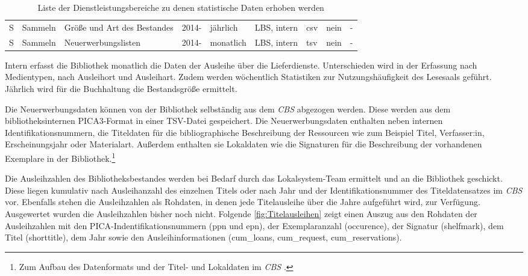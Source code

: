 \begin{table}[H]
\begin{adjustbox}{max width=\textwidth}
\begin{tabular}{p{}p{}p{}p{}p{}p{}p{}p{}p{}}
            S         &Sammeln                       & Größe und Art des Bestandes                   & 2014-             & jährlich          & LBS, intern  & csv                       & nein  & -\\ 
            S         &Sammeln                       & Neuerwerbungslisten                           & 2014-             & monatlich         & LBS, intern  & tsv                       & nein  & -\\ 
            

        \bottomrule
    \end{tabular}
    \end{adjustbox}
    \caption{%
        Liste der Dienstleistungsbereiche zu denen statistische Daten erhoben werden
    \label{tab:Statistische_Daten}
    }
     \end{table}

    
\endgroup


Intern erfasst die Bibliothek monatlich die Daten der Ausleihe über die Lieferdienste. Unterschieden 
wird in der Erfassung nach Medientypen, nach Ausleihort und Ausleihart. Zudem werden wöchentlich 
Statistiken zur Nutzungshäufigkeit des Lesesaals geführt. Jährlich wird für die Buchhaltung die Bestandsgröße ermittelt.

Die Neuerwerbungsdaten können von der Bibliothek selbständig aus dem \textit{\acrshort{CBS}} abgezogen werden. Diese werden aus
dem bibliotheksinternen PICA3-Format in einer TSV-Datei gespeichert. Die Neuerwerbungsdaten enthalten neben internen Identifikationsnummern, die Titeldaten für die bibliographische Beschreibung der Ressourcen wie zum Beispiel Titel, Verfasser:in, Erscheinungsjahr oder Materialart.
Außerdem enthalten sie Lokaldaten wie die Signaturen für die Beschreibung der vorhandenen Exemplare in der Bibliothek.\footnote{Zum Aufbau des Datenformats und der Titel- und Lokaldaten im \textit{\acrlong{CBS}} \cite[vgl.][]{hebis_datenstruktur_2017}.}

Die Ausleihzahlen des Bibliotheksbestandes werden bei Bedarf durch das Lokalsystem-Team ermittelt und an die Bibliothek geschickt. 
Diese liegen kumulativ nach Ausleihanzahl des einzelnen Titels oder nach Jahr und der Identifikationsnummer des Titeldatensatzes im 
\textit{\acrshort{CBS}} vor. Ebenfalls stehen die Ausleihzahlen als Rohdaten, in denen jede Titelausleihe über die Jahre aufgeführt wird, zur Verfügung.
Ausgewertet wurden die Ausleihzahlen bisher noch nicht. Folgende \autoref{fig:Titelausleihen} zeigt einen Auszug aus den Rohdaten der Ausleihzahlen mit 
den PICA-Indentifikationsnummern (ppn und epn), der Exemplaranzahl (occurence), der Signatur (shelfmark), dem Titel (shorttitle),
dem Jahr sowie den Ausleihinformationen (cum\_loans, cum\_request, cum\_reservations).



